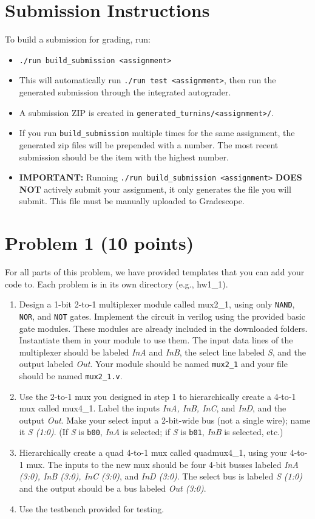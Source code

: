\documentclass[12pt]{article}
\begin{document}
\section*{Submission Instructions}

To build a submission for grading, run:
\begin{itemize}
\item \texttt{./run build\_submission <assignment>}
\item This will automatically run \texttt{./run test <assignment>}, then run the generated submission
through the integrated autograder.
\item A submission ZIP is created in \texttt{generated\_turnins/<assignment>/}.
\item If you run \texttt{build\_submission} multiple times for the same assignment, the generated zip files will be prepended with a number. The most recent submission should be the item with the highest number.
\item \textbf{IMPORTANT:} Running \texttt{./run build\_submission <assignment>} \textbf{DOES NOT} actively submit your assignment, it only generates the file you will submit. This file must be manually uploaded to Gradescope.
\end{itemize}

\section*{Problem 1 (10 points)}
For all parts of this problem, we have provided templates that you can add your code to.  Each problem is in its own directory (e.g., hw1\_1).
\begin{enumerate}
\item
Design a 1-bit 2-to-1 multiplexer module called mux2\_1, using only \texttt{NAND}, \texttt{NOR}, and \texttt{NOT} gates.
Implement the circuit in verilog using the provided basic gate modules. These modules are already included in the downloaded folders. Instantiate them in your module to use them. 
The input data lines of the multiplexer should be labeled \textit{InA} and \textit{InB}, the select line labeled \textit{S}, and the output labeled \textit{Out}.
Your module should be named \texttt{mux2\_1} and
your file should be named \texttt{mux2\_1.v}.
\item
Use the 2-to-1 mux you designed in step 1 to hierarchically create a 4-to-1 mux called mux4\_1.
Label the inputs \textit{InA, InB, InC}, and \textit{InD}, and the output \textit{Out}.
Make your select input a 2-bit-wide bus (not a single wire); name it \textit{S (1:0)}. (If \textit{S} is \texttt{b00}, \textit{InA} is selected; if \textit{S} is \texttt{b01}, \textit{InB} is selected, etc.)
\item
Hierarchically create a quad 4-to-1 mux called quadmux4\_1, using your 4-to-1 mux.
The inputs to the new mux should be four 4-bit busses labeled \textit{InA (3:0), InB (3:0), InC (3:0)}, and \textit{InD (3:0)}.
The select bus is labeled \textit{S (1:0)} and the output should be a bus labeled \textit{Out (3:0)}.
\item
Use the testbench provided for testing.
\end{enumerate}
\end{document}
